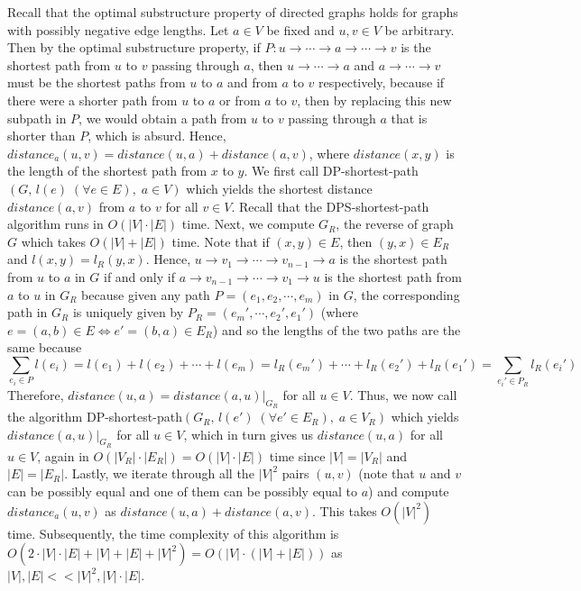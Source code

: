 \documentclass[tikz, letterpaper,12pt]{article}
\newcounter{problemid}\stepcounter{problemid}
\def\newproblem{\vspace*{0.01cm}{\bf Problem~\arabic{problemid}\stepcounter{problemid}}\hfill\fbox{\parbox{0.16\textwidth}{\bf Points:}}\par}
\begin{document}
\newproblem
Recall that the optimal substructure property of directed graphs holds for graphs with possibly negative edge lengths. Let $a\in V$ be fixed and $u,v\in V$ be arbitrary. Then by the optimal substructure property, if $P\colon u\to\cdots\to a\to \cdots \to v$ is the shortest path from $u$ to $v$ passing through $a$, then $u \to \cdots\to a$ and $a \to \cdots\to v$ must be the shortest paths from $u$ to $a$ and from $a$ to $v$ respectively, because if there were a shorter path from $u$ to $a$ or from $a$ to $v$, then by replacing this new subpath in $P$, we would obtain a path from $u$ to $v$ passing through $a$ that is shorter than $P$, which is absurd. Hence, $distance_a(u,v)=distance(u,a)+distance(a,v)$, where $distance(x,y)$ is the length of the shortest path from $x$ to $y$. We first call DP-shortest-path$(G,\,l(e)\;(\forall e\in E),\; a\in V)$ which yields the shortest distance $distance(a,v)$ from $a$ to $v$ for all $v\in V$. 
Recall that the DPS-shortest-path algorithm runs in $O(|V|\cdot |E|)$ time. 
Next, we compute $G_R$, the reverse of graph $G$ which takes $O(|V|+|E|)$ time. Note that if $(x,y)\in E$, then $(y,x)\in E_R$ and $l(x,y)=l_R(y,x)$. Hence, $u\to v_1\to\cdots \to v_{n-1}\to a$ is the shortest path from $u$ to $a$ in $G$ if and only if $a\to v_{n-1}\to\cdots\to v_1\to u$ is the shortest path from $a$ to $u$ in $G_R$ because given any path $P=(e_1,e_2,\cdots,e_m)$ in $G$, the corresponding path in $G_R$ is uniquely given by $P_R=(e_m',\cdots,e_2',e_1')$ (where $e=(a,b)\in E\iff e'=(b,a)\in E_R$) and so the lengths of the two paths are the same because $$\sum_{e_i\in P}l(e_i)=l(e_1)+l(e_2)+\cdots+l(e_m)=l_R(e_m')+\cdots+l_R(e_2')+l_R(e_1')=\sum_{e_i'\in P_R} l_R(e_i')$$ Therefore, $distance(u,a)=distance(a,u)|_{G_R}$ for all $u\in V$. Thus, we now call the algorithm DP-shortest-path$(G_R,\,l(e')\;(\forall e'\in E_R),\; a\in V_R)$ which yields $distance(a,u)|_{G_R}$ for all $u\in V$, which in turn gives us $distance(u, a)$ for all $u\in V$, again in $O(|V_R|\cdot |E_R|)=O(|V|\cdot |E|)$ time since $|V|=|V_R|$ and $|E|=|E_R|$. Lastly, we iterate through all the $|V|^2$ pairs $(u,v)$ (note that $u$ and $v$ can be possibly equal and one of them can be possibly equal to $a$) and compute  $distance_a(u,v)$ as $distance(u,a)+distance(a,v)$. This takes $O(|V|^2)$ time. Subsequently, the time complexity of this algorithm is $O(2\cdot|V|\cdot|E|+|V|+|E|+|V|^2)=O(|V|\cdot(|V|+|E|))$ as $|V|,|E|<<|V|^2,|V|\cdot |E|$.
\end{document}
